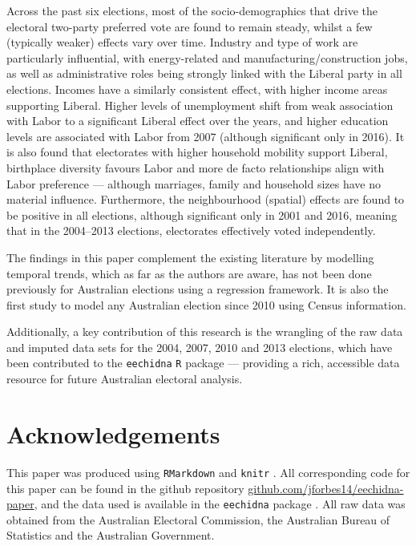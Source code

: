 \documentclass[11pt,a4paper,]{article}
\begin{document}
Across the past six elections, most of the socio-demographics that drive the electoral two-party preferred vote are found to remain steady, whilst a few (typically weaker) effects vary over time. Industry and type of work are particularly influential, with energy-related and manufacturing/construction jobs, as well as administrative roles being strongly linked with the Liberal party in all elections. Incomes have a similarly consistent effect, with higher income areas supporting Liberal. Higher levels of unemployment shift from weak association with Labor to a significant Liberal effect over the years, and higher education levels are associated with Labor from 2007 (although significant only in 2016). It is also found that electorates with higher household mobility support Liberal, birthplace diversity favours Labor and more de facto relationships align with Labor preference --- although marriages, family and household sizes have no material influence. Furthermore, the neighbourhood (spatial) effects are found to be positive in all elections, although significant only in 2001 and 2016, meaning that in the 2004--2013 elections, electorates effectively voted independently.

The findings in this paper complement the existing literature by modelling temporal trends, which as far as the authors are aware, has not been done previously for Australian elections using a regression framework. It is also the first study to model any Australian election since 2010 using Census information.

Additionally, a key contribution of this research is the wrangling of the raw data and imputed data sets for the 2004, 2007, 2010 and 2013 elections, which have been contributed to the \texttt{eechidna} \texttt{R} package --- providing a rich, accessible data resource for future Australian electoral analysis.

\hypertarget{acknowledgements}{%
\section{Acknowledgements}\label{acknowledgements}}

This paper was produced using \texttt{RMarkdown} \autocite{rmarkdown} and \texttt{knitr} \autocite{knitr}. All corresponding code for this paper can be found in the github repository \href{https://github.com/jforbes14/eechidna-paper}{github.com/jforbes14/eechidna-paper}, and the data used is available in the \texttt{eechidna} package \autocite{eechidna}. All raw data was obtained from the Australian Electoral Commission, the Australian Bureau of Statistics and the Australian Government.
\end{document}
